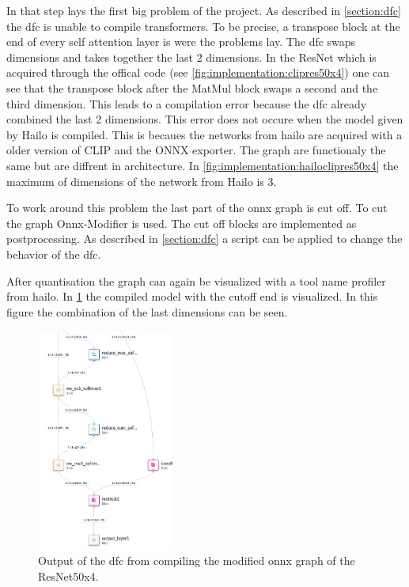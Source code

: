 In that step lays the first big problem of the project.
As described in \cref{section:dfc} the \acrshort{dfc} is unable to compile transformers.
To be precise, a transpose block at the end of every self attention layer is were the problems lay.
The \acrshort{dfc} swaps dimensions and takes together the last 2 dimensions.
In the ResNet which is acquired through the offical code (see \cref{fig:implementation:clipres50x4}) one can see that the transpose block after the MatMul block swaps a second and the third dimension.
This leads to a compilation error because the \acrshort{dfc} already combined the last 2 dimensions.
This error does not occure when the model given by Hailo is compiled.
This is becaues the networks from hailo are acquired with a older version of CLIP and the ONNX exporter.
The graph are functionaly the same but are diffrent in architecture.
In \cref{fig:implementation:hailoclipres50x4} the maximum of dimensions of the network from Hailo is 3.

To work around this problem the last part of the onnx graph is cut off.
To cut the graph Onnx-Modifier \cite{onnxmodifier} is used.
The cut off blocks are implemented as postprocessing.
As described in \cref{section:dfc} a script can be applied to change the behavior of the \acrshort{dfc}.

After quantisation the graph can again be visualized with a tool name profiler from hailo.
In \cref{fig:implementation:compareRN50x4qunathar} the compiled model with the cutoff end is visualized.
In this figure the combination of the last dimensions can be seen.

\begin{figure}
    \centering
    \includegraphics[width=0.4\textwidth]{Images/Implementation/ClipRes50x4_qunat_Har.png}
    \caption{Output of the \acrshort{dfc} from compiling the modified onnx graph of the ResNet50x4.}
    \label{fig:implementation:compareRN50x4qunathar}
\end{figure}

